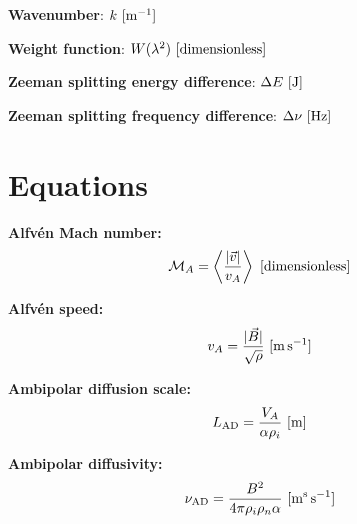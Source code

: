 \documentclass[a4paper,10pt]{article}
\begin{document}
{\noindent}\textbf{Wavenumber}: $k~[{\rm m^{-1}}]$

{\noindent}\textbf{Weight function}: $W(\lambda^2)~[\rm{dimensionless}]$

{\noindent}\textbf{Zeeman splitting energy difference}: $\Delta E ~ [{\rm J}]$

{\noindent}\textbf{Zeeman splitting frequency difference}: $\Delta \nu ~ [{\rm Hz}]$









































\newpage
\section{Equations}

{\noindent}\textbf{Alfv\'en Mach number:}
\begin{align*}
    \mathcal{M}_A = \left\langle\frac{\lvert\vec{v}\rvert}{v_A}\right\rangle ~ [{\rm dimensionless}]
\end{align*}

{\noindent}\textbf{Alfv\'en speed:}
\begin{align*}
    v_A = \frac{\lvert\vec{B}\lvert}{\sqrt{\rho}} ~ [{\rm m\,s^{-1}}]
\end{align*}

{\noindent}\textbf{Ambipolar diffusion scale:}
\begin{align*}
    L_\mathrm{AD} = \dfrac{V_A}{\alpha\rho_i} ~ [\rm m]
\end{align*}

{\noindent}\textbf{Ambipolar diffusivity:}
\begin{align*}
    \nu_\mathrm{AD} = \dfrac{B^2}{4\pi\rho_i\rho_n\alpha} ~ [{\rm m^s\,s^{-1}}]
\end{align*}
\end{document}
